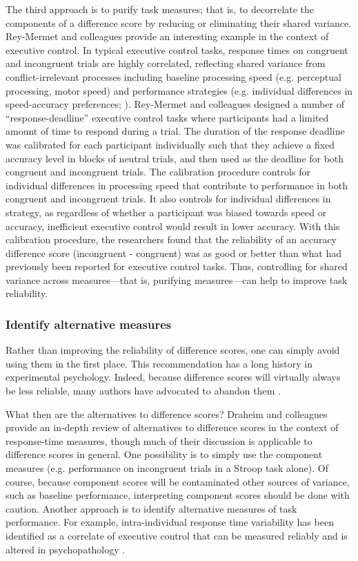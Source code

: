 \documentclass[a4paper,12pt]{article}
\begin{document}
The third approach is to purify task measures; that is, to decorrelate the components of a difference score by reducing or eliminating their shared variance. Rey-Mermet and colleagues \cite{rey2019executive} provide an interesting example in the context of executive control. In typical executive control tasks, response times on congruent and incongruent trials are highly correlated, reflecting shared variance from conflict-irrelevant processes including baseline processing speed (e.g. perceptual processing, motor speed) and performance strategies (e.g. individual differences in speed-accuracy preferences; \cite{draheim2019reaction}). Rey-Mermet and colleagues designed a number of ``response-deadline'' executive control tasks where participants had a limited amount of time to respond during a trial. The duration of the response deadline was calibrated for each participant individually such that they achieve a fixed accuracy level in blocks of neutral trials, and  then used as the deadline for both congruent and incongruent trials. The calibration procedure controls for individual differences in processing speed that contribute to performance in both congruent and incongruent trials. It also controls for individual differences in strategy, as regardless of whether a participant was biased towards speed or accuracy, inefficient executive control would result in lower accuracy. With this calibration procedure, the researchers found that the reliability of an accuracy difference score (incongruent - congruent) was as good or better than what had previously been reported for executive control tasks. Thus, controlling for shared variance across measures---that is, purifying measures---can help to improve task reliability.

\subsubsection{Identify alternative measures}

Rather than improving the reliability of difference scores, one can simply avoid using them in the first place. This recommendation has a long history in experimental psychology. Indeed, because difference scores will virtually always be less reliable, many authors have advocated to abandon them \cite{lord1956measurement, cronbach1970we, edwards2001ten}. 

What then are the alternatives to difference scores? Draheim and colleagues \cite{draheim2019reaction} provide an in-depth review of alternatives to difference scores in the context of response-time measures, though much of their discussion is applicable to difference scores in general. One possibility is to simply use the component measures (e.g. performance on incongruent trials in a Stroop task alone). Of course, because component scores will be contaminated other sources of variance, such as baseline performance, interpreting component scores should be done with caution. Another approach is to identify alternative measures of task performance. For example, intra-individual response time variability has been identified as a correlate of executive control that can be measured reliably \cite{saville2011stability} and is altered in psychopathology \cite{kofler2013reaction}. 
\end{document}
